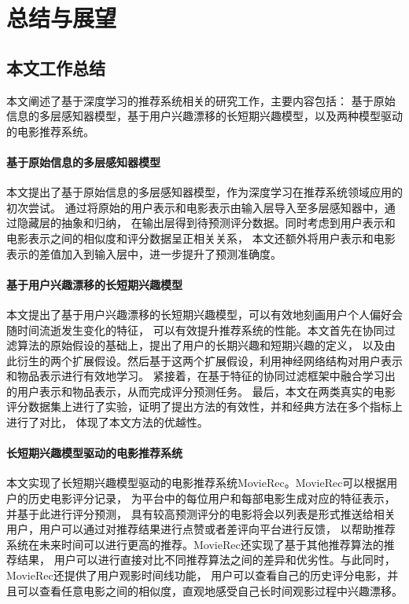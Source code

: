 \chapter{总结与展望}
\section{本文工作总结}
本文阐述了基于深度学习的推荐系统相关的研究工作，主要内容包括：
基于原始信息的多层感知器模型，基于用户兴趣漂移的长短期兴趣模型，以及两种模型驱动的电影推荐系统。

\subsubsection{基于原始信息的多层感知器模型}
本文提出了基于原始信息的多层感知器模型，作为深度学习在推荐系统领域应用的初次尝试。
通过将原始的用户表示和电影表示由输入层导入至多层感知器中，通过隐藏层的抽象和归纳，
在输出层得到待预测评分数据。同时考虑到用户表示和电影表示之间的相似度和评分数据呈正相关关系，
本文还额外将用户表示和电影表示的差值加入到输入层中，进一步提升了预测准确度。

\subsubsection{基于用户兴趣漂移的长短期兴趣模型}
本文提出了基于用户兴趣漂移的长短期兴趣模型，可以有效地刻画用户个人偏好会随时间流逝发生变化的特征，
可以有效提升推荐系统的性能。本文首先在协同过滤算法的原始假设的基础上，提出了用户的长期兴趣和短期兴趣的定义，
以及由此衍生的两个扩展假设。然后基于这两个扩展假设，利用神经网络结构对用户表示和物品表示进行有效地学习。
紧接着，在基于特征的协同过滤框架中融合学习出的用户表示和物品表示，从而完成评分预测任务。
最后，本文在两类真实的电影评分数据集上进行了实验，证明了提出方法的有效性，并和经典方法在多个指标上进行了对比，
体现了本文方法的优越性。

\subsubsection{长短期兴趣模型驱动的电影推荐系统}
本文实现了长短期兴趣模型驱动的电影推荐系统MovieRec。MovieRec可以根据用户的历史电影评分记录，
为平台中的每位用户和每部电影生成对应的特征表示，并基于此进行评分预测，
具有较高预测评分的电影将会以列表是形式推送给相关用户，用户可以通过对推荐结果进行点赞或者差评向平台进行反馈，
以帮助推荐系统在未来时间可以进行更高的推荐。MovieRec还实现了基于其他推荐算法的推荐结果，
用户可以进行直接对比不同推荐算法之间的差异和优劣性。与此同时，MovieRec还提供了用户观影时间线功能，
用户可以查看自己的历史评分电影，并且可以查看任意电影之间的相似度，直观地感受自己长时间观影过程中兴趣漂移。

